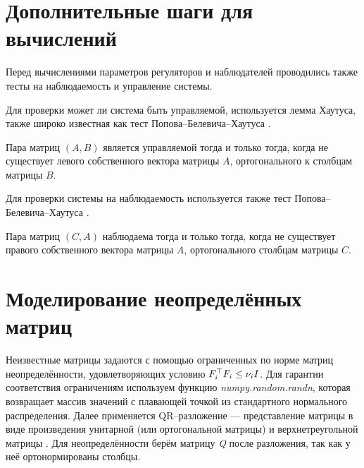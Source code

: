 \chapter{Дополнительные шаги для вычислений}\label{app:B}

Перед вычислениями параметров регуляторов и наблюдателей проводились также тесты на наблюдаемость и управление системы. 

Для проверки может ли система быть управляемой, используется лемма Хаутуса, также широко известная как тест Попова--Белевича--Хаутуса \cite{bernstein2018scalar}.
\begin{lemma}
	Пара матриц $(A, B)$ является управляемой тогда и только тогда, когда не существует левого собственного вектора матрицы $A$, ортогонального к столбцам матрицы $B$.
\end{lemma}

Для проверки системы на наблюдаемость используется также тест Попова--Белевича--Хаутуса \cite{Sontag1998}.

\begin{lemma}
	Пара матриц $(C, A)$ наблюдаема тогда и только тогда, когда не существует правого собственного вектора матрицы $A$, ортогонального столбцам матрицы $C$.
\end{lemma}

\chapter{Моделирование неопределённых матриц}\label{app:С}
	
Неизвестные матрицы задаются с помощью ограниченных по норме матриц неопределённости, удовлетворяющих условию ${F}_i^\top{F}_i\leq \nu_i {I}$. Для гарантии соответствия ограничениям используем функцию \textit{numpy.random.randn}, которая возвращает массив значений с плавающей точкой из стандартного нормального распределения. Далее применяется QR--разложение --- представление матрицы в виде произведения унитарной (или ортогональной матрицы) и верхнетреугольной матрицы \cite{horn1990matrix}. Для неопределённости берём матрицу \textit{Q} после разложения, так как у неё ортонормированы столбцы.

\begin{comment}
\begin{ListingEnv}[!h]	
\captiondelim{ } %
\caption{Программа задания неопределённости}\label{lst:delta}
	\begin{Verb}
		import numpy as np
		
		# dim_Delta - размерность матрицы F
		Random_matrix = np.random.randn(dim_Delta, dim_Delta)
		# QR-декомпозиция, Q матрица с ортонормированными столбцами
		F, _ = np.linalg.qr(Random_matrix)
	\end{Verb}
\end{ListingEnv}
\end{comment}